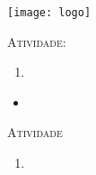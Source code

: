 \documentclass[10 pt,usenames,dvipsnames, oneside]{article}
\begin{document}
\begin{center}
  \begin{minipage}[l]{3cm}
\texttt{[image: logo]}    
\end{minipage}\hfill
\begin{minipage}[r]{.8\textwidth}
 {\Large \scshape Atividade: }  
\end{minipage}
\end{center}
\vspace{.2cm}

\ifdefined\prof
\begin{objetivos}
\item 
\end{objetivos}

\begin{goals}
\begin{enumerate}
\item
\end{enumerate}

\tcblower

\begin{itemize}
\item 
\end{itemize}
\end{goals}

\bigskip
\begin{center}
{\large \scshape Atividade}
\end{center}
\fi



\ifdefined\prof
\begin{solucao}

\begin{enumerate}
\item
\end{enumerate}

\end{solucao}
\fi
\end{document}
